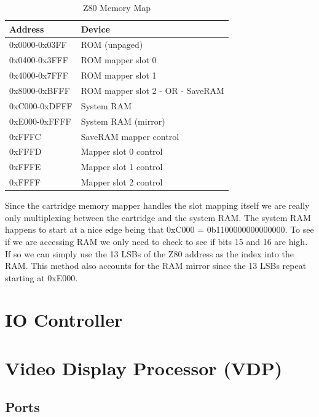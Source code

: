 \documentclass{article}
\begin{document}
\begin{table}[H]
    \centering
    \selectfont
    \begin{tabular}{l|l}
        Address     & Device                           \\
        \hline
        \hline
        0x0000-0x03FF & ROM (unpaged)                    \\ 
        0x0400-0x3FFF & ROM mapper slot 0                \\ 
        0x4000-0x7FFF & ROM mapper slot 1                \\ 
        0x8000-0xBFFF & ROM mapper slot 2 - OR - SaveRAM \\ 
        0xC000-0xDFFF & System RAM                       \\ 
        0xE000-0xFFFF & System RAM (mirror)              \\ 
        0xFFFC       & SaveRAM mapper control           \\ 
        0xFFFD       & Mapper slot 0 control            \\ 
        0xFFFE       & Mapper slot 1 control            \\ 
        0xFFFF       & Mapper slot 2 control            \\
    \end{tabular}
    \fontfamily{}\selectfont
    \caption{Z80 Memory Map \protect\cite{mem_map_table}}
\end{table}

Since the cartridge memory mapper handles the slot mapping itself we are
really only multiplexing between the cartridge and the system RAM.
The system RAM happens to start at a nice edge being that
0xC000 = 0b1100000000000000. To see if we are accessing RAM
we only need to check to see if bits 15 and 16 are high. If so
we can simply use the 13 LSBs of the Z80 address as the index into the RAM. 
This method also accounts for the RAM mirror since the 13 LSBs repeat
starting at 0xE000.

\section{IO Controller}
\section{Video Display Processor (VDP)}
\subsection{Ports}
\end{document}
